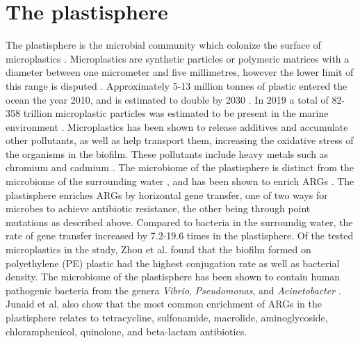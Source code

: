 \section{The plastisphere}
The plastisphere is the microbial community which colonize the surface of microplastics \cite{amaralzettler2020EcologyPlastisphere}. 
Microplastics are synthetic particles or polymeric matrices with a diameter between one micrometer and five millimetres, however the lower limit of this range is disputed \cite{frias2019MicroplasticsFindingConsensus}.
Approximately 5-13 million tonnes of plastic entered the ocean the year 2010, and is estimated to double by 2030 \cite{amaralzettler2020EcologyPlastisphere}. In 2019 a total of 82-358 trillion microplastic particles was estimated to be present in the marine environment \cite{eriksen2023GrowingPlasticSmog}.
Microplastics has been shown to release additives and accumulate other pollutants, as well as help transport them, increasing the oxidative stress of the organisms in the biofilm. These pollutants include heavy metals such as chromium and cadmium \cite{forero-lopez2022PlastisphereMicroplasticsSitu}.
The microbiome of the plastisphere is distinct from the microbiome of the surrounding water \cite{zadjelovic2023MicrobialHitchhikersHarbouring}, and has been shown to enrich ARGs \cite{zhou2024MicroplasticBiofilmsPromote}.
The plastisphere enriches ARGs by horizontal gene transfer, one of two ways for microbes to achieve antibiotic resistance, the other being through point mutations as described above.
Compared to bacteria in the surroundig water, the rate of gene transfer increased by 7.2-19.6 times \cite{zhou2024MicroplasticBiofilmsPromote} in the plastisphere. Of the tested microplastics in the study, Zhou et al. found that the biofilm formed on polyethylene (PE) plastic had the highest conjugation rate as well as bacterial density. 
The microbiome of the plastisphere has been shown to contain human pathogenic bacteria from the genera \emph{Vibrio}, \emph{Pseudomonas}, and \emph{Acinetobacter} \cite{junaid2022SelectiveEnrichmentAntibiotic}. Junaid et al. also show that the most common enrichment of ARGs in the plastisphere relates to tetracycline, sulfonamide, macrolide, aminoglycoside, chloramphenicol, quinolone, and beta-lactam antibiotics.


